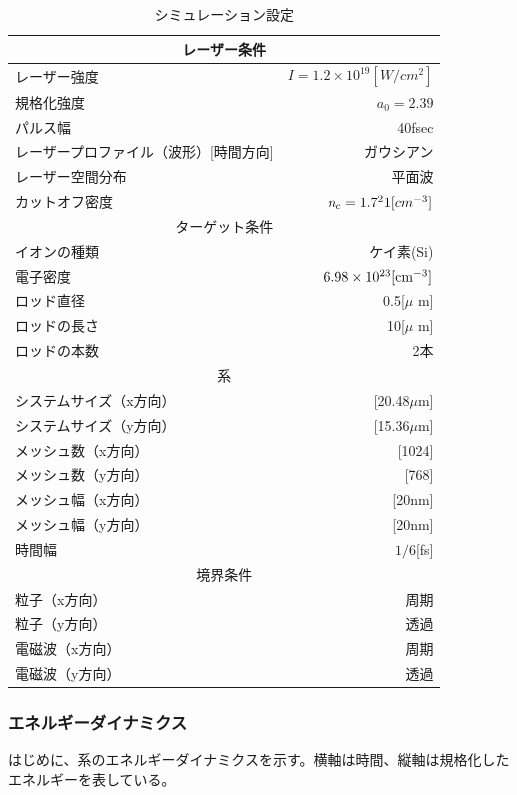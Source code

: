 \documentclass[a4paper,11pt,titlepage]{jarticle}
\numberwithin{equation}{section} %
\begin{document}
\begin{table}[H]
  \begin{center}
    \caption{シミュレーション設定}
  \begin{tabular}{|l|r|} \hline
    \multicolumn{2}{|c|}{レーザー条件} \\ \hline
    レーザー強度 & $\textit{I}=1.2\times  10^{19}[W/cm^2]$ \\ 
    規格化強度 & $\textit{a} _0 = 2.39$ \\
    パルス幅 & 40fsec \\ 
    レーザープロファイル（波形）[時間方向] & ガウシアン \\
    レーザー空間分布 & 平面波 \\
    カットオフ密度 & $\textit{n} _c = 1.7 \time 10^21 [cm^{-3}]$ \\\hline
    \multicolumn{2}{|c|}{ターゲット条件} \\ \hline
    イオンの種類 & ケイ素(Si) \\
    電子密度 &$6.98 \times  10 ^{23} [\rm{cm}^{-3}]$ \\
    ロッド直径 & 0.5[$\mu$ m] \\
    ロッドの長さ & 10[$\mu$ m] \\
    ロッドの本数 & 2本 \\ \hline
    \multicolumn{2}{|c|}{系} \\ \hline
    システムサイズ（x方向） & [20.48$\mu $m] \\
    システムサイズ（y方向） & [15.36$\mu $m] \\
    メッシュ数（x方向） & [1024] \\
    メッシュ数（y方向） & [768] \\
    メッシュ幅（x方向） & [20nm] \\
    メッシュ幅（y方向） & [20nm] \\
    時間幅 & $1/6$[fs] \\ \hline
    \multicolumn{2}{|c|}{境界条件} \\ \hline
    粒子（x方向） & 周期 \\
    粒子（y方向） & 透過 \\
    電磁波（x方向） & 周期 \\
    電磁波（y方向） & 透過 \\ \hline
  \end{tabular}
  \end{center}
  \end{table}

  \subsubsection{エネルギーダイナミクス}
  はじめに、系のエネルギーダイナミクスを示す。横軸は時間、縦軸は規格化したエネルギーを表している。
  
\end{document}
